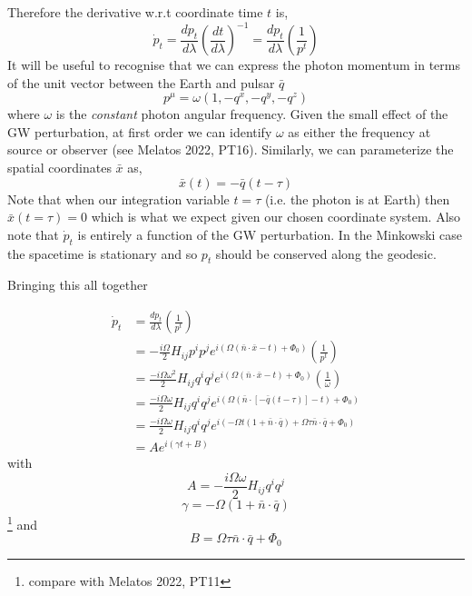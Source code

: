 \documentclass{tufte-handout} %
\begin{document}
\noindent Therefore the derivative w.r.t coordinate time $t$ is,
\begin{equation}
\dot{p}_t = \frac{d p_{t}}{d \lambda} \left(\frac{dt}{d\lambda}\right)^{-1} = \frac{d p_{t}}{d \lambda} \left(\frac{1}{p^t}\right)
\end{equation}
It will be useful to recognise that we can express the photon momentum in terms of the  unit vector between the Earth and pulsar $\bar{q}$
\begin{equation}
	p^{\mu} = \omega(1,-q^x,-q^y,-q^z)
\end{equation}
where $\omega$ is the \textit{constant} photon angular frequency. Given the small effect of the GW perturbation, at first order we can identify $\omega$ as either the frequency at source or observer (see Melatos 2022, PT16). Similarly, we can parameterize the spatial coordinates $\bar{x}$ as,
\begin{equation}
	\bar{x}(t) = - \bar{q} (t - \tau)
\end{equation} 
Note that when our integration variable $t = \tau$ (i.e. the photon is at Earth) then $\bar{x}(t=\tau) = 0$ which is what we expect given our chosen coordinate system. Also note that $\dot{p}_t$ is entirely a function of the GW perturbation. In the Minkowski case the spacetime is stationary and so $p_t$ should be conserved along the geodesic. \newline 





\noindent Bringing this all together 


\begin{align}
	\dot{p}_t &= \frac{d p_{t}}{d \lambda} \left(\frac{1}{p^t}\right) \\  
	&= -\frac{i\Omega}{2} H_{ij}p^i p^j  e^{i(\Omega(\bar{n}\cdot \bar{x} - t)+\Phi_0)} \left(\frac{1}{p^t}\right)
	\\
	&= \frac{-i\Omega \omega^2}{2} H_{ij}q^i q^j  e^{i(\Omega(\bar{n}\cdot \bar{x} - t)+\Phi_0)} \left(\frac{1}{\omega}\right) \\
	& = \frac{-i\Omega \omega}{2} H_{ij}q^i q^j  e^{i(\Omega(\bar{n}\cdot [- \bar{q} (t - \tau)] - t)+\Phi_0)} \\
				& = \frac{-i\Omega \omega}{2} H_{ij}q^i q^j  e^{i(-\Omega t (1+ \bar{n} \cdot \bar{q}) + \Omega \tau  \bar{n} \cdot \bar{q} +\Phi_0)} \\
						& =A e^{i (\gamma t + B)}
\end{align}
with 
\begin{equation}
	A = -\frac{i\Omega \omega}{2} H_{ij}q^i q^j 
\end{equation}
\begin{equation}
	\gamma = -\Omega (1 + \bar{n}\cdot \bar{q}) 
\end{equation}
\footnote{compare with Melatos 2022, PT11}
and 
\begin{equation}
	B = \Omega \tau \bar{n} \cdot \bar{q}  +\Phi_0
\end{equation}
\end{document}
